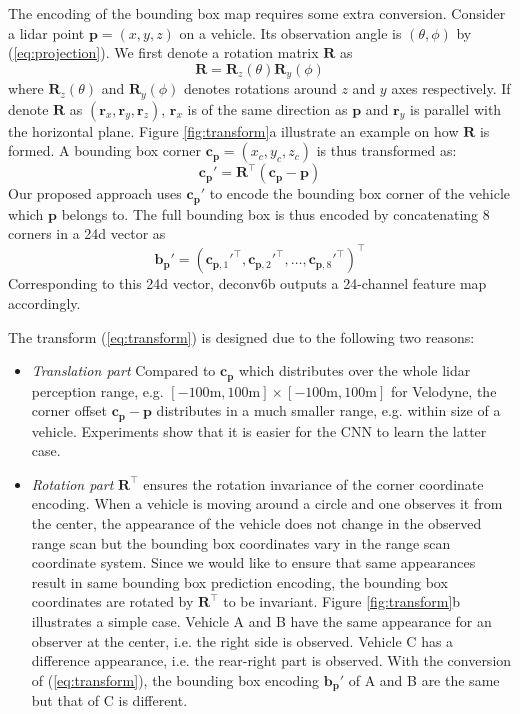 \documentclass[conference]{IEEEtran}
\begin{document}
The encoding of the bounding box map requires some extra conversion. Consider a lidar point $\mathbf{p} = (x, y, z)$ on a vehicle. Its observation angle is $(\theta, \phi)$ by (\ref{eq:projection}). We first denote a rotation matrix $\mathbf{R}$ as
\begin{equation}
\mathbf{R} = \mathbf{R}_z(\theta) \mathbf{R}_y(\phi) 
\end{equation}
where $\mathbf{R}_z(\theta)$ and $\mathbf{R}_y(\phi)$ denotes rotations around $z$ and $y$ axes respectively. If denote $\mathbf{R}$ as $(\mathbf{r}_x, \mathbf{r}_y, \mathbf{r}_z)$, $\mathbf{r}_x$ is of the same direction as $\mathbf{p}$ and $\mathbf{r}_y$ is parallel with the horizontal plane. Figure \ref{fig:transform}a illustrate an example on how $\mathbf{R}$ is formed. A bounding box corner $\mathbf{c}_\mathbf{p} = (x_c, y_c, z_c)$ is thus transformed as:
\begin{equation}
\mathbf{c}_\mathbf{p}' = \mathbf{R}^\top ( \mathbf{c}_\mathbf{p} - \mathbf{p} )
\label{eq:transform}
\end{equation}
Our proposed approach uses $\mathbf{c}_\mathbf{p}'$ to encode the bounding box corner of the vehicle which $\mathbf{p}$ belongs to. The full bounding box is thus encoded by concatenating 8 corners in a 24d vector as 
\begin{equation}
\mathbf{b}_\mathbf{p}' = (\mathbf{c}_{\mathbf{p}, 1}'^\top, \mathbf{c}_{\mathbf{p}, 2}'^\top, \dots, \mathbf{c}_{\mathbf{p}, 8}'^\top)^\top
\label{eq:box_encoding}
\end{equation}
Corresponding to this 24d vector, deconv6b outputs a 24-channel feature map accordingly.

The transform (\ref{eq:transform}) is designed due to the following two reasons:
\begin{itemize}
\item \textit{Translation part} Compared to $\mathbf{c}_\mathbf{p}$ which distributes over the whole lidar perception range, e.g. $[-100\textrm{m}, 100\textrm{m}]\times[-100\textrm{m}, 100\textrm{m}]$ for Velodyne, the corner offset $\mathbf{c}_\mathbf{p} - \mathbf{p}$ distributes in a much smaller range, e.g. within size of a vehicle. Experiments show that it is easier for the CNN to learn the latter case.
\item \textit{Rotation part} $\mathbf{R}^\top$ ensures the rotation invariance of the corner coordinate encoding. When a vehicle is moving around a circle and one observes it from the center, the appearance of the vehicle does not change in the observed range scan but the bounding box coordinates vary in the range scan coordinate system. Since we would like to ensure that same appearances result in same bounding box prediction encoding, the bounding box coordinates are rotated by $\mathbf{R}^\top$ to be invariant. Figure \ref{fig:transform}b illustrates a simple case. Vehicle A and B have the same appearance for an observer at the center, i.e. the right side is observed. Vehicle C has a difference appearance, i.e. the rear-right part is observed. With the conversion of (\ref{eq:transform}), the bounding box encoding $\mathbf{b}_\mathbf{p}'$ of A and B are the same but that of C is different.
\end{itemize}
\end{document}
